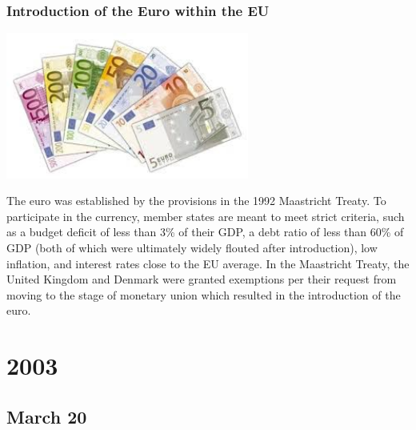 \documentclass[11pt]{report}
\begin{document}
\subsection{Introduction of the Euro within the EU}
\vspace{2mm}\begin{center}\includegraphics[width=8cm]{./img/euro.jpg}\end{center}
The euro was established by the provisions in the 1992 Maastricht Treaty. To participate in the currency, member states are meant to meet strict criteria, such as a budget deficit of less than 3\% of their GDP, a debt ratio of less than 60\% of GDP (both of which were ultimately widely flouted after introduction), low inflation, and interest rates close to the EU average. In the Maastricht Treaty, the United Kingdom and Denmark were granted exemptions per their request from moving to the stage of monetary union which resulted in the introduction of the euro.

\chapter{2003}
\section{March 20}
\end{document}
